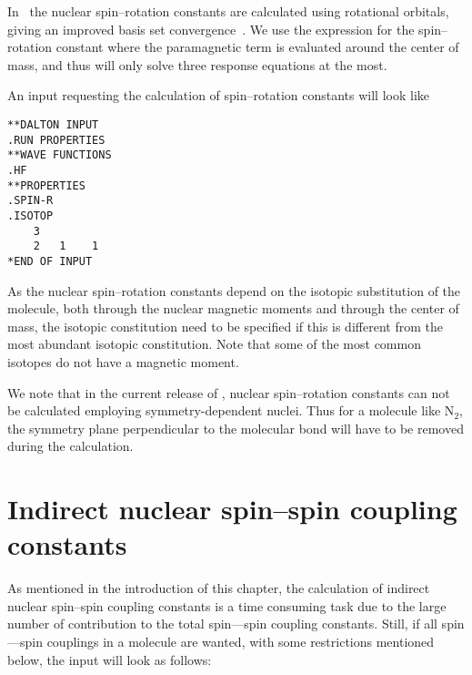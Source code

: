 In \siraba\ the nuclear spin--rotation
constants are calculated using 
rotational orbitals, giving an improved 
basis set convergence~\cite{jgkrthjcp105}. We use the
expression for the spin--rotation constant where the paramagnetic term
is evaluated around the center of mass, and thus will only solve three
response equations at the most.

An input requesting the calculation of spin--rotation constants will
look like

\begin{verbatim}
**DALTON INPUT
.RUN PROPERTIES
**WAVE FUNCTIONS
.HF
**PROPERTIES
.SPIN-R
.ISOTOP
    3
    2   1    1
*END OF INPUT
\end{verbatim}

As the nuclear spin--rotation constants
depend on the isotopic substitution of 
the molecule, both through the nuclear magnetic moments and through the
center of mass, the isotopic constitution need to be specified if this
is different  from the most abundant isotopic constitution. Note that
some of the most common isotopes do not have a magnetic moment.

We note that in the current release of \siraba , nuclear spin--rotation
constants can not be calculated employing symmetry-dependent
nuclei. Thus for a molecule like N$_2$, the symmetry plane
perpendicular to the molecular bond will have to be removed during the
calculation.

\section{Indirect nuclear spin--spin coupling
constants}\label{sec:spinspin}

\begin{center}
\end{center}

As mentioned in the introduction of this chapter, the calculation of
indirect nuclear 
spin--spin coupling constants is a time consuming task due to the
large number of contribution to the total spin---spin coupling
constants. Still, if all spin---spin couplings in a molecule are wanted, 
with some restrictions mentioned below, the input will look as
follows:


